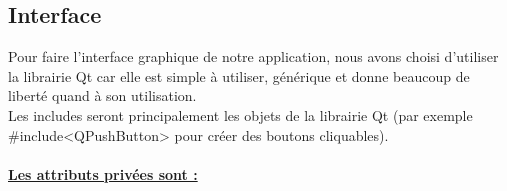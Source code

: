 \documentclass[a4paper,11pt]{article}
\begin{document}
		\subsection{Interface}
			Pour faire l'interface graphique de notre application, nous avons choisi d'utiliser la librairie Qt car elle est simple à utiliser, générique et donne beaucoup de liberté quand à son utilisation.\\
			Les includes seront principalement les objets de la librairie Qt 
			(par exemple \#include<QPushButton> pour créer des boutons cliquables).\\
			\\
			\underline{\bf Les attributs privées sont :}\\
\end{document}
